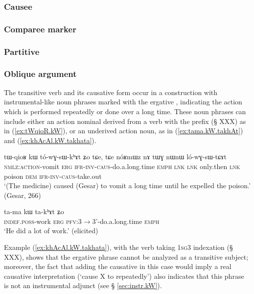 \subsubsection{Causee} \label{sec:causee.kW}
\subsubsection{Comparee marker} \label{sec:comparee.kW}

\subsubsection{Partitive} \label{sec:partitive.kW}
\subsubsection{Oblique argument} \label{sec:oblique.kW}
 The transitive verb  and its causative form  occur in a construction with instrumental-like noun phrases marked with the ergative , indicating the action which is performed repeatedly or done over a long time. These noun phrases can include either an action nominal derived from a verb with the prefix  (§ XXX) as in (\ref{ex:tWqioR.kW}), or an underived action noun, as in (\ref{ex:tama.kW.takhAt}) and (\ref{ex:khAcAl.kW.takhata}).  
 
  \begin{exe}
\ex \label{ex:tWqioR.kW}
\gll tɯ-qioʁ kɯ tó-wɣ-sɯ-kʰɤt ʑo tɕe, tɕe nóʁmɯz nɤ tɯɣ nɯnɯ ló-wɣ-sɯ-tɕɤt  \\
\textsc{nmlz:action}-vomit \textsc{erg} \textsc{ifr-inv-caus}-do.a.long.time \textsc{emph} \textsc{lnk} \textsc{lnk} only.then \textsc{lnk} poison \textsc{dem} \textsc{ifr-inv-caus}-take.out \\
\glt `(The medicine) caused (Gesar) to vomit a long time until he expelled the poison.' (Gesar, 266)
\end{exe}

  \begin{exe}
\ex \label{ex:tama.kW.takhAt}
\gll ta-ma kɯ ta-kʰɤt ʑo  \\
\textsc{indef.poss}-work \textsc{erg} \textsc{pfv}:3$\rightarrow$3'-do.a.long.time \textsc{emph} \\
\glt `He did a lot of work.' (elicited)
\end{exe}

Example (\ref{ex:khAcAl.kW.takhata}), with the verb   taking \textsc{1sg}\fl{}3 indexation (§ XXX), shows that the ergative phrase cannot be analyzed as a transitive subject; moreover, the fact that adding the causative in this case would imply a real causative interpretation (`cause X to repeatedly') also indicates that this phrase is not an instrumental adjunct (see § \ref{sec:instr.kW}).

